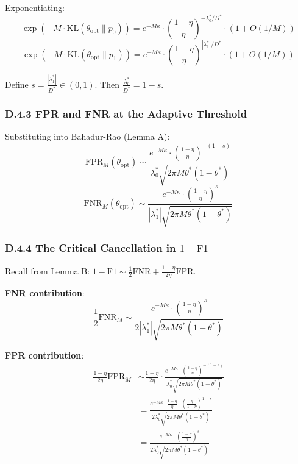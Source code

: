 \documentclass[
  12pt,
]{ctexart}
\begin{document}
Exponentiating:
\[\exp(-M \cdot \text{KL}(\theta_{\text{opt}} \| p_0)) = e^{-M\kappa} \cdot \left(\frac{1-\eta}{\eta}\right)^{-\lambda_0^*/D^*} \cdot (1 + O(1/M))\]
\[\exp(-M \cdot \text{KL}(\theta_{\text{opt}} \| p_1)) = e^{-M\kappa} \cdot \left(\frac{1-\eta}{\eta}\right)^{|\lambda_1^*|/D^*} \cdot (1 + O(1/M))\]

Define \(s = \frac{|\lambda_1^*|}{D^*} \in (0,1)\). Then
\(\frac{\lambda_0^*}{D^*} = 1-s\).

\subsubsection{D.4.3 FPR and FNR at the Adaptive
Threshold}\label{d.4.3-fpr-and-fnr-at-the-adaptive-threshold}

Substituting into Bahadur-Rao (Lemma A):
\[\text{FPR}_M(\theta_{\text{opt}}) \sim \frac{e^{-M\kappa} \cdot \left(\frac{1-\eta}{\eta}\right)^{-(1-s)}}{\lambda_0^* \sqrt{2\pi M \theta^*(1-\theta^*)}}\]
\[\text{FNR}_M(\theta_{\text{opt}}) \sim \frac{e^{-M\kappa} \cdot \left(\frac{1-\eta}{\eta}\right)^{s}}{|\lambda_1^*| \sqrt{2\pi M \theta^*(1-\theta^*)}}\]

\subsubsection{\texorpdfstring{D.4.4 The Critical Cancellation in
\(1-\text{F1}\)}{D.4.4 The Critical Cancellation in 1-\textbackslash text\{F1\}}}\label{d.4.4-the-critical-cancellation-in-1-textf1}

Recall from Lemma B:
\(1 - \text{F1} \sim \frac{1}{2}\text{FNR} + \frac{1-\eta}{2\eta}\text{FPR}\).

\textbf{FNR contribution}:
\[\frac{1}{2}\text{FNR}_M \sim \frac{e^{-M\kappa} \cdot \left(\frac{1-\eta}{\eta}\right)^{s}}{2|\lambda_1^*| \sqrt{2\pi M \theta^*(1-\theta^*)}}\]

\textbf{FPR contribution}: \[\begin{aligned}
\frac{1-\eta}{2\eta}\text{FPR}_M &\sim \frac{1-\eta}{2\eta} \cdot \frac{e^{-M\kappa} \cdot \left(\frac{1-\eta}{\eta}\right)^{-(1-s)}}{\lambda_0^* \sqrt{2\pi M \theta^*(1-\theta^*)}} \\
&= \frac{e^{-M\kappa} \cdot \frac{1-\eta}{\eta} \cdot \left(\frac{\eta}{1-\eta}\right)^{1-s}}{2\lambda_0^* \sqrt{2\pi M \theta^*(1-\theta^*)}} \\
&= \frac{e^{-M\kappa} \cdot \left(\frac{1-\eta}{\eta}\right)^{s}}{2\lambda_0^* \sqrt{2\pi M \theta^*(1-\theta^*)}}
\end{aligned}\]
\end{document}
